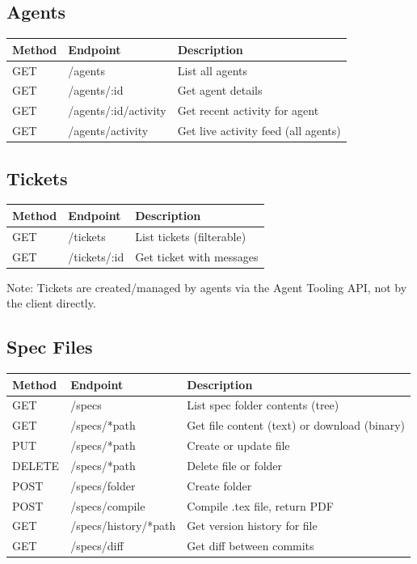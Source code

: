\documentclass[11pt,a4paper]{article}
\begin{document}
\subsection{Agents}

\begin{longtable}{p{2.5cm} p{4cm} p{7cm}}
\toprule
\textbf{Method} & \textbf{Endpoint} & \textbf{Description} \\
\midrule
\endhead
GET    & /agents               & List all agents \\
GET    & /agents/:id           & Get agent details \\
GET    & /agents/:id/activity  & Get recent activity for agent \\
GET    & /agents/activity      & Get live activity feed (all agents) \\
\bottomrule
\end{longtable}

\subsection{Tickets}

\begin{longtable}{p{2.5cm} p{4cm} p{7cm}}
\toprule
\textbf{Method} & \textbf{Endpoint} & \textbf{Description} \\
\midrule
\endhead
GET    & /tickets              & List tickets (filterable) \\
GET    & /tickets/:id          & Get ticket with messages \\
\bottomrule
\end{longtable}

Note: Tickets are created/managed by agents via the Agent Tooling API, not by the client directly.

\subsection{Spec Files}

\begin{longtable}{p{2.5cm} p{4cm} p{7cm}}
\toprule
\textbf{Method} & \textbf{Endpoint} & \textbf{Description} \\
\midrule
\endhead
GET    & /specs                & List spec folder contents (tree) \\
GET    & /specs/*path          & Get file content (text) or download (binary) \\
PUT    & /specs/*path          & Create or update file \\
DELETE & /specs/*path          & Delete file or folder \\
POST   & /specs/folder         & Create folder \\
POST   & /specs/compile        & Compile .tex file, return PDF \\
GET    & /specs/history/*path  & Get version history for file \\
GET    & /specs/diff           & Get diff between commits \\
\bottomrule
\end{longtable}
\end{document}
